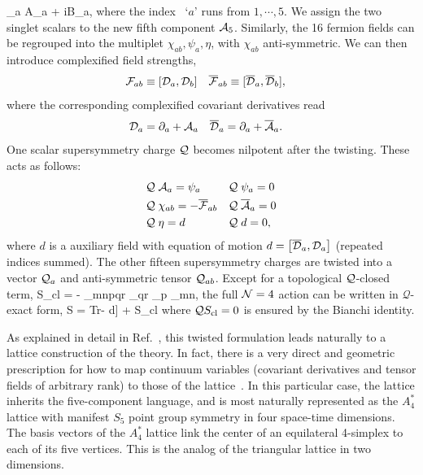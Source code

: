 \beq
  \label{5dgauge}
  \cA_a \equiv A_a + iB_a,
\eeq
where the index ~`$a$' runs from $1, \cdots, 5$.
We assign the two singlet scalars to the new fifth component $\mathcal A_5$.
Similarly, the 16 fermion fields can be regrouped into the multiplet $\chi_{ab}, \psi_a, \eta$, with $\chi_{ab}$ anti-symmetric.
We can then introduce complexified field strengths,
\begin{align}
  {\cal F}_{ab} & \equiv [\mathcal D_a, \mathcal D_b] &
  {\overline{\cal F}}_{ab} & \equiv [{\overline{\cal D}}_a, {\overline{\cal D}}_b],
\end{align}
where the corresponding complexified covariant derivatives read
\begin{align}
  \mathcal D_a & = \partial_a + \mathcal A_a &
  {\overline{\cal D}}_a & = \partial_a + \overline{\mathcal A}_a.
\end{align}
One scalar supersymmetry charge $\mathcal Q$ becomes nilpotent after the twisting.
These acts as follows:
\begin{align}
  & \mathcal Q\; \mathcal A_a = \psi_a         & & \mathcal Q\; \psi_a = 0                       \cr
  & \mathcal Q\; \chi_{ab} = -{\overline{\cal F}}_{ab} & & \mathcal Q\; \overline{\mathcal A}_a = 0 \label{BRSTsymmetry}  \\
  & \mathcal Q\; \eta = d               & & \mathcal Q\; d = 0,                           \nonumber
\end{align}
where $d$ is a auxiliary field with equation of motion $d = \left[{\overline{\cal D}}_a, \mathcal D_a\right]$ (repeated indices summed).
The other fifteen supersymmetry charges are twisted into a vector $\mathcal Q_a$ and anti-symmetric tensor $\mathcal Q_{ab}$.
Except for a topological $\mathcal Q$-closed term,
\beq
  \label{closed}
  S_{\rm cl} = - \int \Tr \epsilon_{mnpqr} \chi_{qr} \cDb_p \chi_{mn},
\eeq
the full $\mathcal N = 4$ action can be written in $\mathcal{Q}$-exact form, 
\beq
  \label{4daction}
  S =  \cQ \int \mbox{Tr}\left[\chi_{ab}\cF_{ab} + \eta [ \cDb_a,\cD_a ] - \eta d\right] + S_{\rm cl}
\eeq
where $\mathcal{Q} S_{\rm cl} = 0$ is ensured by the Bianchi identity.

As explained in detail in Ref.~\cite{Catterall:2007kn}, this twisted formulation leads naturally to a lattice construction of the theory.
In fact, there is a very direct and geometric prescription for how to map continuum variables 
(covariant derivatives and tensor fields of arbitrary rank) to those of the 
lattice~\cite{Catterall:2007kn, Damgaard:2008pa}.
In this particular case, the lattice inherits the five-component language, and is most 
naturally represented as the $A_4^*$ lattice with manifest $S_5$ point group symmetry 
in four space-time dimensions.
The basis vectors of the $A_4^*$ lattice link the center of an equilateral 4-simplex to each of its five vertices.
This is the analog of the triangular lattice in two dimensions. 

